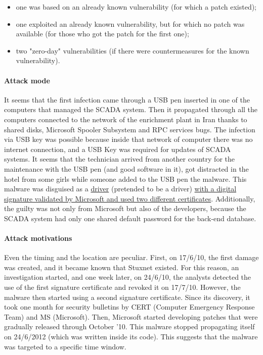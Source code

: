 \begin{itemize}
	\item one was based on an already known vulnerability (for which a patch existed);
	\item one exploited an already known vulnerability, but for which no patch was available (for those who got the patch for the first one);
	\item two "zero-day" vulnerabilities (if there were countermeasures for the known vulnerability).
\end{itemize}

\paragraph{Attack mode}
It seems that the first infection came through a USB pen inserted in one of the computers that managed the
SCADA system. Then it propagated through all the computers connected to the network of the enrichment
plant in Iran thanks to shared disks, Microsoft Spooler Subsystem and RPC services bugs. The infection via
USB key was possible because inside that network of computer there was no internet connection, and a USB
Key was required for updates of SCADA systems. It seems that the technician arrived from another country
for the maintenance with the USB pen (and good software in it), got distracted in the hotel from some girls
while someone added to the USB pen the malware. This malware was disguised as a \ul{driver} (pretended to be a
driver) \ul{with a digital signature validated by Microsoft and used two different certificates}. Additionally, the
guilty was not only from Microsoft but also of the developers, because the SCADA system had only one shared
default password for the back-end database.

\paragraph{Attack motivations}
Even the timing and the location are peculiar. First, on 17/6/10, the first damage was created, and it became known that Stuxnet existed. For this reason, an investigation started, and one week later, on 24/6/10, the analysts detected the use of the first signature certificate and revoked it on 17/7/10. However, the malware then started using a second signature certificate. Since its discovery, it took one month for security bulletins by CERT (Computer Emergency Response Team) and MS (Microsoft). Then, Microsoft started developing patches that were gradually released through October '10. This malware stopped propagating itself on 24/6/2012 (which was written inside its code). This suggests that the malware was targeted to a specific time window.

